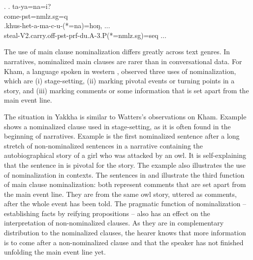 \ex. \ag. ta-ya=na=i?\\
		come{\sc [3sg]-pst=nmlz.sg=q}	\\
 	\bg.khus-het-a-ma-c-u-(*=na)=hoŋ, ...\\
	steal-{\sc V2.carry.off-pst-prf-du.A-3.P(*=nmlz.sg)=seq} ...\\
	 


The use of main clause nominalization differs greatly across text genres. In narratives, nominalized main clauses are rarer than in conversational data. For Kham, a  language spoken in western , \citet{Watters2002A-grammar} observed three uses of nominalization, which are (i) stage-setting, (ii) marking pivotal events or turning points in a story, and (iii) marking comments or some information that is set apart from the main event line. 

The situation in Yakkha is  similar to Watters's observations on Kham. Example \Next[a] shows a nominalized clause used in stage-setting, as it is often found in the beginning of narratives. Example  \Next[b] is the first nominalized sentence after a long stretch of non-nominalized sentences in a narrative containing the autobiographical story of a girl who was attacked by an owl. It is self-explaining that the sentence in \Next[b] is pivotal for the story. The example also illustrates the use of nominalization in  contexts. The sentences in \Next[c] and \Next[d] illustrate the third function of main clause nominalization: both represent comments that are set apart from the main event line. They are from the same owl story, uttered as comments, after the whole event has been told. The  pragmatic function of nominalization –  establishing facts by reifying propositions – also has an effect on the interpretation of non-nominalized clauses.  As they are in complementary distribution to the nominalized clauses, the hearer knows that more information is to come after a non-nominalized clause and that the speaker has not finished unfolding the main event line yet.



